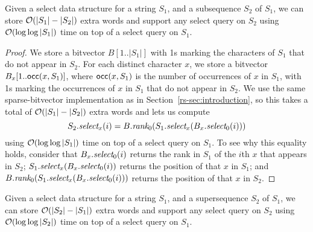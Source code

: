 \begin{lemma}
\label{rs-lem:subsequence}
Given a select data structure for a string $S_1$, and a subsequence $S_2$ of $S_1$, we can store $\mathcal{O}\!\left( |S_1| - |S_2| \right)$ extra words and support any select query on $S_2$ using $\mathcal{O}\!\left( \log \log |S_1| \right)$ time on top of a select query on $S_1$.
\end{lemma}

\begin{proof}
We store a bitvector \(B [1..|S_1|]\) with 1s marking the characters of $S_1$ that do not appear in $S_2$.  For each distinct character $x$, we store a bitvector \(B_x [1..\mathsf{occ} (x, S_1)]\), where \(\mathsf{occ} (x, S_1)\) is the number of occurrences of $x$ in $S_1$, with 1s marking the occurrences of $x$ in $S_1$ that do not appear in $S_2$.  We use the same sparse-bitvector implementation as in Section~\ref{rs-sec:introduction}, so this takes a total of $\mathcal{O}\!\left( |S_1| - |S_2| \right)$ extra words and lets us compute
\[S_2.\textit{select}_x (i) = B.\textit{rank}_0 (S_1.\textit{select}_x (B_x.\textit{select}_0 (i)))\]
using $\mathcal{O}\!\left( \log \log |S_1| \right)$ time on top of a select query on $S_1$.  To see why this equality holds, consider that \(B_x.\textit{select}_0 (i)\) returns the rank in $S_1$ of the $i$th $x$ that appears in $S_2$; \(S_1.\textit{select}_x (B_x.\textit{select}_0 (i))\) returns the position of that $x$ in $S_1$; and \(B.\textit{rank}_0 (S_1.\textit{select}_x (B_x.\textit{select}_0 (i)))\) returns the position of that $x$ in $S_2$.
\end{proof}

\begin{lemma}
\label{rs-lem:supersequence}
Given a select data structure for a string $S_1$, and a supersequence $S_2$ of $S_1$, we can store $\mathcal{O}\!\left( |S_2| - |S_1| \right)$ extra words and support any select query on $S_2$ using $\mathcal{O}\!\left( \log \log |S_2| \right)$ time on top of a select query on $S_1$.
\end{lemma}

